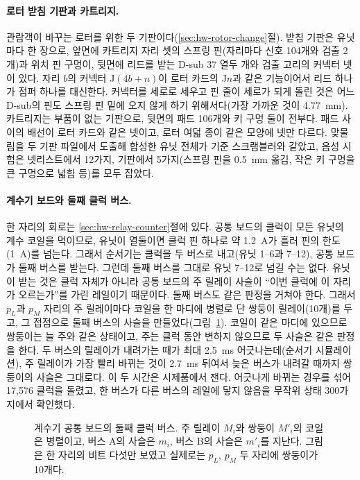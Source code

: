 \paragraph{로터 받침 기판과 카트리지.} 관람객이 바꾸는 로터를 위한 두 기판이다(\ref{sec:hw-rotor-change}절). 받침
기판은 유닛마다 한 장으로, 앞면에 카트리지 자리 셋의 스프링 핀(자리마다 신호 104개와 검출 2개)과 위치 핀 구멍이,
뒷면에 리드를 받는 D-sub 37 열두 개와 검출 고리의 커넥터 넷이 있다. 자리 $b$의 커넥터 J$(4b+n)$이 로터 카드의 J$n$과
같은 기능이어서 리드 하나가 점퍼 하나를 대신한다. 커넥터를 세로로 세우고 핀 줄이 세로가 되게 돌린 것은 어느 D-sub의
핀도 스프링 핀 밑에 오지 않게 하기 위해서다(가장 가까운 것이 4.77~mm). 카트리지는 부품이 없는 기판으로, 뒷면의 패드
106개와 키 구멍 둘이 전부다. 패드 사이의 배선이 로터 카드와 같은 넷이고, 로터 여덟 종이 같은 모양에 넷만 다르다.
맞물림을 두 기판 파일에서 도출해 합성한 유닛 전체가 기준 스크램블러와 같았고, 음성 시험은 넷리스트에서 12가지, 기판에서
5가지(스프링 핀을 0.5~mm 옮김, 작은 키 구멍을 큰 구멍으로 넓힘 등)를 모두 잡았다.

\paragraph{계수기 보드와 둘째 클럭 버스.} 한 자리의 회로는 \ref{sec:hw-relay-counter}절에 있다. 공통 보드의 클럭이 모든 유닛의
계수 코일을 먹이므로, 유닛이 열둘이면 클럭 핀 하나로 약 1.2~A가 흘러 핀의 한도(1~A)를 넘는다. 그래서 순서기는 클럭을 두
버스로 내고(유닛 1--6과 7--12), 공통 보드가 둘째 버스를 받는다. 그런데 둘째 버스를 그대로 유닛 7--12로 넘길 수는 없다.
유닛이 받는 것은 클럭 자체가 아니라 공통 보드의 주 릴레이 사슬이 ``이번 클럭에 이 자리가 오르는가''를 가린 레일이기
때문이다. 둘째 버스도 같은 판정을 거쳐야 한다. 그래서 $p_L$과 $p_M$ 자리의 주 릴레이마다 코일을 한 마디에 병렬로 단 쌍둥이
릴레이(10개)를 두고, 그 접점으로 둘째 버스의 사슬을 만들었다(그림~\ref{fig:hw-counter-busb}). 코일이 같은 마디에 있으므로
쌍둥이는 늘 주와 같은 상태이고, 주는 클럭 동안 변하지 않으므로 두 사슬은 같은 판정을 한다. 두 버스의 릴레이가 내려가는
때가 최대 2.5~ms 어긋나는데(순서기 시뮬레이션), 주 릴레이가 가장 빨리 바뀌는 것이 2.7~ms 뒤여서 늦은 버스가 내려갈 때까지
쌍둥이의 사슬은 그대로다. 이 두 시간은 시제품에서 잰다. 어긋나게 바뀌는 경우를 섞어 17,576 클럭을 돌렸고, 한 버스가 다른
버스의 레일에 닿지 않음을 무작위 상태 300가지에서 확인했다.

\begin{figure}[ht]
\centering

\caption{계수기 공통 보드의 둘째 클럭 버스. 주 릴레이 $M_i$와 쌍둥이 $M'_i$의 코일은 병렬이고, 버스 A의 사슬은 $m_i$,
버스 B의 사슬은 $m'_i$를 지난다. 그림은 한 자리의 비트 다섯만 보였고 실제로는 $p_L$, $p_M$ 두 자리에 쌍둥이가 10개다.}
\label{fig:hw-counter-busb}
\end{figure}

